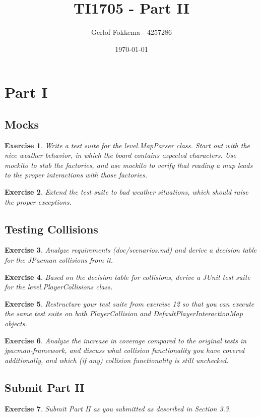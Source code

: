 \documentclass[a4paper]{article}
\title{TI1705 - Part II}
\author{Gerlof Fokkema - 4257286}
\date{\today}
\newtheorem{thm}{Exercise}
\begin{document}
  \maketitle
  \section{Part I}
  
  \subsection{Mocks}
    \begin{thm}
      Write a test suite for the level.MapParser class. Start out with the nice
      weather behavior, in which the board contains expected characters. Use mockito
      to stub the factories, and use mockito to verify that reading a map leads to the
      proper interactions with those factories.
    \end{thm}

    \begin{thm}
      Extend the test suite to bad weather situations,
      which should raise the proper exceptions.
    \end{thm}
    
  \subsection{Testing Collisions}
    \begin{thm}
      Analyze requirements (doc/scenarios.md) and derive a decision table for the
      JPacman collisions from it.
    \end{thm}

    \begin{thm}
      Based on the decision table for collisions, derive a JUnit test suite for the
      level.PlayerCollisions class.
    \end{thm}

    \begin{thm}
      Restructure your test suite from exercise 12 so that you can execute the same test
      suite on both PlayerCollision and DefaultPlayerInteractionMap objects.
    \end{thm}
    
    \begin{thm}
      Analyze the increase in coverage compared to the original tests in jpacman-framework,
      and discuss what collision functionality you have covered additionally,
      and which (if any) collision functionality is still unchecked.
    \end{thm}
  
  \subsection{Submit Part II}
    \begin{thm}
      Submit Part II as you submitted as described in Section 3.3.
    \end{thm}
\end{document}
